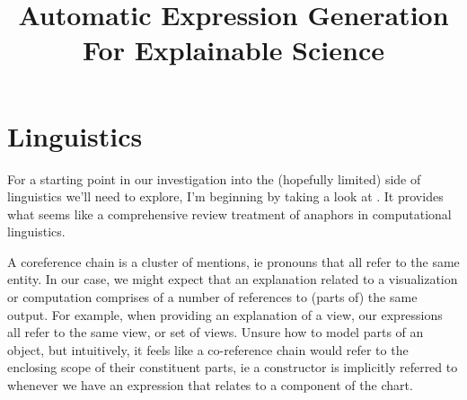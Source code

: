 \documentclass[acmsmall,screen]{acmart}
\begin{document}
\title[Automatic Expression Generation For Explainable Science]{Automatic Expression Generation For Explainable Science}
\maketitle

\section{Linguistics}
For a starting point in our investigation into the (hopefully limited) side of linguistics we'll need to explore, I'm 
beginning by taking a look at \citet{poesio23}. It provides what seems like a comprehensive review treatment of anaphors
in computational linguistics. 

A coreference chain is a cluster of mentions, ie pronouns that all refer to the same entity. In our case, we might
expect that an explanation related to a visualization or computation comprises of a number of references to (parts of)
the same output. For example, when providing an explanation of a view, our expressions all refer to the same view, or
set of views. Unsure how to model parts of an object, but intuitively, it feels like a co-reference chain would
refer to the enclosing scope of their constituent parts, ie a  constructor is implicitly referred to
whenever we have an expression that relates to a component of the chart.


\end{document}
